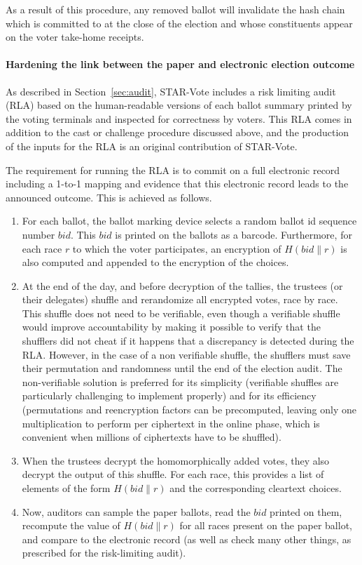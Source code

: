 As a result of this procedure, any removed ballot will
invalidate the hash chain which is committed to at the close of the
election and whose constituents appear on the voter take-home receipts.

\paragraph{Hardening the link between the paper and electronic
  election outcome}
\label{sec:hard-link-betw}

\newcommand{\bid}{\ensuremath{{bid}}\xspace}
\newcommand{\bcid}{\ensuremath{{bcid}}\xspace}

As described in Section~\ref{sec:audit}, STAR-Vote includes a risk
limiting audit (RLA) based on the human-readable versions of each
ballot summary printed by the voting terminals and inspected for
correctness by voters.  This RLA comes in addition to the cast or
challenge procedure discussed above, and the production of the
inputs for the RLA is an original contribution of STAR-Vote. 

The requirement for running the RLA is to commit on a full electronic
record including a 1-to-1 mapping and evidence that this electronic
record leads to the announced outcome.
%
This is achieved as follows.
\begin{enumerate}
\item For each ballot, the ballot marking device selects a random ballot id sequence number
$\bid$. This \bid is printed on the ballots as a barcode. Furthermore,
for each race $r$ to which the voter participates, an encryption of
$H(\bid \| r)$ is also computed and appended to the encryption of the
choices.
\item At the end of the day, and before decryption of the tallies, the
  trustees (or their delegates) shuffle and rerandomize all encrypted
  votes, race by race. This shuffle does not need to be verifiable,
  even though a verifiable shuffle would improve accountability by
  making it possible to verify that the shufflers did not cheat if it
  happens that a discrepancy is detected during the RLA. However, in
  the case of a non verifiable shuffle, the shufflers must save their
  permutation and randomness until the end of the election audit. The
  non-verifiable solution is preferred for its simplicity (verifiable
  shuffles are particularly challenging to implement properly) and for
  its efficiency (permutations and reencryption factors can be
  precomputed, leaving only one multiplication to perform per
  ciphertext in the online phase, which is convenient when millions of
  ciphertexts have to be shuffled).
\item When the trustees decrypt the homomorphically added votes, they
  also decrypt the output of this shuffle. For each race, this
  provides a list of elements of the form $H(\bid \| r)$ and the
  corresponding cleartext choices.
\item Now, auditors can sample the paper ballots, read the \bid
  printed on them, recompute the value of $H(\bid \| r)$ for all races
  present on the paper ballot, and compare to the electronic record
  (as well as check many other things, as prescribed for the
  risk-limiting audit).
\end{enumerate}

